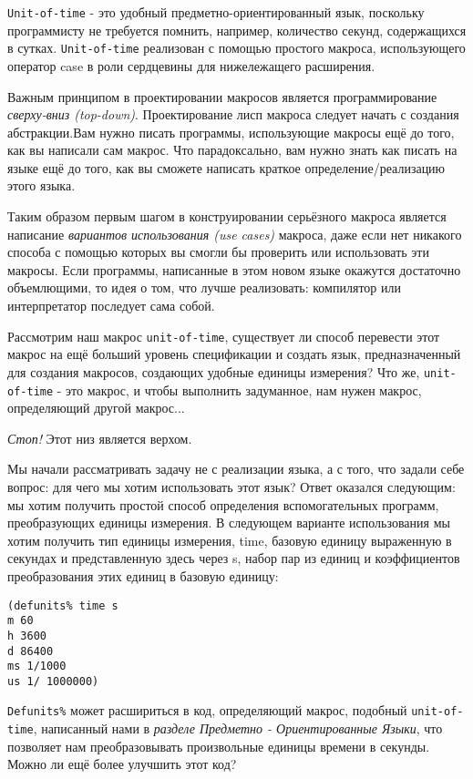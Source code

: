 \verb"Unit-of-time" - это удобный предметно-ориентированный язык, поскольку программисту не требуется помнить, например, количество секунд, содержащихся в сутках. \verb"Unit-of-time" реализован с помощью простого макроса, использующего оператор case в роли сердцевины для нижележащего расширения.

Важным принципом в проектировании макросов является программирование \emph{сверху-вниз (top-down)}. Проектирование лисп макроса следует начать с создания абстракции.Вам нужно писать программы, использующие макросы ещё до того, как вы написали сам макрос. Что парадоксально, вам нужно знать как писать на языке ещё до того, как вы сможете написать краткое определение/реализацию этого языка.

Таким образом первым шагом в конструировании серьёзного макроса является написание \emph{вариантов использования (use cases)} макроса, даже если нет никакого способа с помощью которых вы смогли бы проверить или использовать эти макросы. Если программы, написанные в этом новом языке окажутся достаточно объемлющими, то идея о том, что лучше реализовать: компилятор или интерпретатор последует сама собой.

Рассмотрим наш макрос \verb"unit-of-time", существует ли способ перевести этот макрос на ещё больший уровень спецификации и создать язык, предназначенный для создания макросов, создающих удобные единицы измерения? Что же, \verb"unit-of-time" - это макрос, и чтобы выполнить задуманное, нам нужен макрос, определяющий другой макрос...

\emph{Стоп!} Этот низ является верхом.

Мы начали рассматривать задачу не с реализации языка, а с того, что задали себе вопрос: для чего мы хотим использовать этот язык? Ответ оказался следующим: мы хотим получить простой способ определения вспомогательных программ, преобразующих единицы измерения. В следующем варианте использования мы хотим получить тип единицы измерения, time, базовую единицу выраженную в секундах и представленную здесь через s, набор пар из единиц и коэффициентов преобразования этих единиц в базовую единицу:

\begin{verbatim}
(defunits% time s
m 60
h 3600
d 86400
ms 1/1000
us 1/ 1000000)
\end{verbatim}

\verb"Defunits%" может расшириться в код, определяющий макрос, подобный \verb"unit-of-time", написанный нами в \emph{разделе Предметно - Ориентированные Языки}, что позволяет нам преобразовывать произвольные единицы времени в секунды. Можно ли ещё более улучшить этот код?

